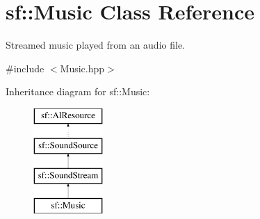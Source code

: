 \hypertarget{classsf_1_1_music}{}\section{sf\+:\+:Music Class Reference}
\label{classsf_1_1_music}


Streamed music played from an audio file.  




{\ttfamily \#include $<$Music.\+hpp$>$}

Inheritance diagram for sf\+:\+:Music\+:\begin{figure}[H]
\begin{center}
\leavevmode
\includegraphics[height=4.000000cm]{classsf_1_1_music}
\end{center}
\end{figure}
